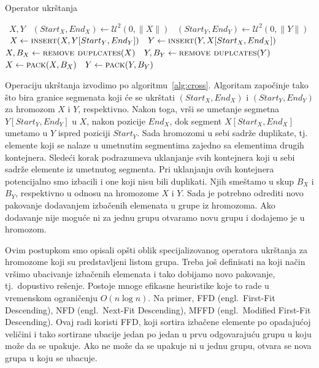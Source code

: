 \documentclass[a4paper,12pt,twocolumn]{article}
\begin{document}
\begin{algorithm}
    \caption{Operator ukrštanja}\label{alg:cross}
    \begin{algorithmic}[1]
        \Require\ $X, Y$ 
        \State\ $(Start_X, End_X) \gets \mathcal{U}^2(0, \|X\|)$
        \State\ $(Start_Y, End_Y) \gets \mathcal{U}^2(0, \|Y\|)$
        \State\ $X \gets \Call{insert}{X, Y[Start_Y, End_Y]}$
        \State\ $Y \gets \Call{insert}{Y, X[Start_X, End_X]}$
        \State\ $X, B_X \gets \Call{remove duplcates}{X}$
        \State\ $Y, B_Y \gets \Call{remove duplcates}{Y}$
        \State\ $X \gets \Call{pack}{X, B_X}$
        \State\ $Y \gets \Call{pack}{Y, B_Y}$
    \end{algorithmic}
\end{algorithm}

Operaciju ukrštanja izvodimo po algoritmu~\ref{alg:cross}. Algoritam 
započinje tako što bira granice segmenata koji će se ukrštati 
$(Start_X, End_X)$ i $(Start_Y, End_Y)$ za hromozom $X$ i $Y$, respektivno. 
Nakon toga, vrši se umetanje segmetna $Y[Start_Y, End_Y]$ u $X$, nakon 
pozicije $End_X$, dok segment $X[Start_X, End_X]$ umetamo u $Y$ ispred 
poziciji $Start_Y$. Sada hromozomi u sebi sadrže duplikate, tj. elemente
koji se nalaze u umetnutim segmentima zajedno sa elementima drugih kontejnera.
Sledeći korak podrazumeva uklanjanje svih kontejnera koji u sebi sadrže
elemente iz umetnutog segmenta. Pri uklanjanju ovih kontejnera potencijalno
smo izbacili i one koji nisu bili duplikati. Njih smeštamo u skup $B_X$ i 
$B_Y$, respektivno u odnosu na hromozome $X$ i $Y$. Sada je potrebno odrediti 
novo pakovanje dodavanjem izbačenih elemenata u grupe iz hromozoma. Ako
dodavanje nije moguće ni za jednu grupu otvaramo novu grupu i dodajemo je u
hromozom. 

Ovim postupkom smo opisali opšti oblik specijalizovanog operatora ukrštanja
za hromozome koji su predstavljeni listom grupa. Treba još definisati na koji
način vršimo ubacivanje izbačenih elemenata i tako dobijamo novo pakovanje,
tj.\ dopustivo rešenje. Postoje mnoge efikasne heuristike koje to rade
u vremenskom ograničenju $O(n \log n)$. Na primer, FFD (engl.\ First-Fit 
Descending), NFD (engl.\ Next-Fit Descending), MFFD (engl.\ Modified First-Fit
Descending)\cite{cgj96}. Ovaj radi koristi FFD, koji sortira izbačene elemente po
opadajućoj veličini i tako sortirane ubacije jedan po jedan u prvu 
odgovarajuću grupu u koju može da se upakuje. Ako ne može da se upakuje ni u
jednu grupu, otvara se nova grupa u koju se ubacuje.
\end{document}

